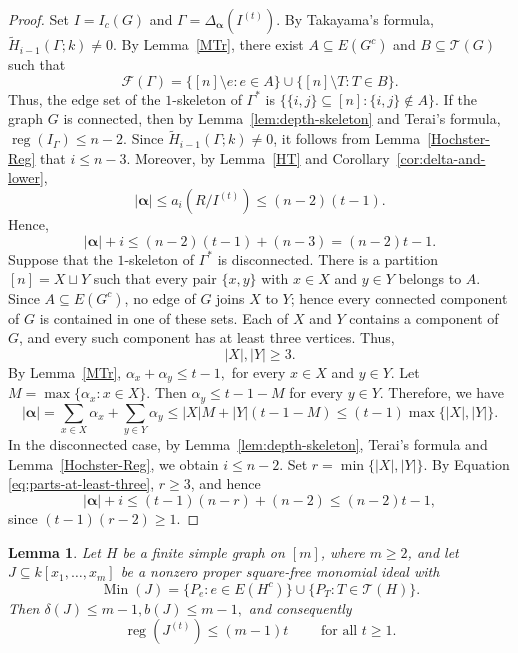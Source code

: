 \documentclass[12pt]{amsart}
\newtheorem{lemma}[proposition]{Lemma}
\DeclareMathOperator{\reg}{reg}
\DeclareMathOperator{\Min}{Min}
\begin{document}
\begin{proof}
Set $I=I_c(G)$ and $\Gamma=\Delta_{\boldsymbol\alpha}(I^{(t)})$. By Takayama's formula, $\widetilde H_{i-1}(\Gamma;k)\ne0$. By Lemma~\ref{MTr}, there exist $A\subseteq E(G^c)$ and $B\subseteq\mathcal T(G)$ such that
\[
\mathcal F(\Gamma)=\{[n]\setminus e:e\in A\}\cup\{[n]\setminus T:T\in B\}.
\]
Thus, the edge set of the \(1\)-skeleton of \(\Gamma^*\) is \(\bigl\{\{i,j\}\subseteq [n] : \{i,j\}\notin A\bigr\}.\) If the graph $G$ is connected, then by Lemma~\ref{lem:depth-skeleton} and Terai's formula, $\reg(I_\Gamma) \le n-2$. Since $\widetilde H_{i-1}(\Gamma;k)\ne0$, it follows from Lemma~\ref{Hochster-Reg} that $i\le n-3$. Moreover, by Lemma~\ref{HT} and Corollary~\ref{cor:delta-and-lower},
\[
|\boldsymbol{\alpha}|\le a_i(R/I^{(t)})\le(n-2)(t-1).
\]
Hence, \[
|\boldsymbol{\alpha}|+i\le(n-2)(t-1)+(n-3)=(n-2)t-1.
\]
\noindent
Suppose that the $1$-skeleton of $\Gamma^*$ is disconnected. There is a partition $[n]=X\sqcup Y$ such that every pair $\{x,y\}$ with $x\in X$ and $y\in Y$ belongs to $A$. Since $A\subseteq E(G^c)$, no edge of $G$ joins $X$ to $Y$; hence every connected component of $G$ is contained in one of these sets. Each of $X$ and $Y$ contains a component of $G$, and every such component has at least three vertices. Thus,
\begin{equation}\label{eq:parts-at-least-three}
|X|,|Y|\ge3.
\end{equation}
By Lemma~\ref{MTr}, \(\alpha_x+\alpha_y\le t-1,\) for every $x\in X$ and $y\in Y$. Let $M=\max\{\alpha_x:x\in X\}$. Then $\alpha_y\le t-1-M$ for every $y\in Y$. Therefore, we have
\[
|\boldsymbol\alpha| = \sum_{x\in X}\alpha_x
+
\sum_{y\in Y}\alpha_y \le |X|M+|Y|(t-1-M)\le(t-1)\max\{|X|,|Y|\}.
\]
In the disconnected case, by Lemma~\ref{lem:depth-skeleton}, Terai's formula and Lemma~\ref{Hochster-Reg}, we obtain  $i\le n-2$. Set $r=\min\{|X|,|Y|\}$. By Equation \eqref{eq:parts-at-least-three}, $r\ge3$, and hence
\[
|\boldsymbol\alpha|+i\le(t-1)(n-r)+(n-2)\le(n-2)t-1,
\]
since $(t-1)(r-2)\ge1$.
\end{proof}


\begin{lemma}\label{lem:universal-local}
Let \(H\) be a finite simple graph on \([m]\), where \(m\geq 2\), and
let \(J\subseteq k[x_1,\ldots,x_m]\) be a nonzero proper
square-free monomial ideal with
\[
\Min(J)
=
\{P_e:e\in E(H^c)\}
\cup
\{P_T:T\in\mathcal T(H)\}.
\]
Then $\delta(J)\leq m-1, b(J)\leq m-1,$
and consequently
\[
\operatorname{reg}(J^{(t)})
\leq (m-1)t \qquad \text{ for all } t\geq 1.
\]
\end{lemma}
\end{document}
